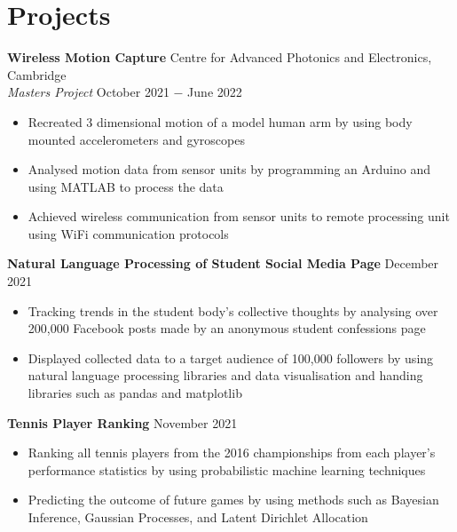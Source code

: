 \documentclass[8pt]{article}
\begin{document}
\section*{Projects}

\textbf{Wireless Motion Capture} \hfill Centre for Advanced Photonics and Electronics, Cambridge\\
\textit{Masters Project} \hfill October 2021 $-$ June 2022
\begin{itemize}
    \item Recreated 3 dimensional motion of a model human arm by using body mounted accelerometers and gyroscopes
    \item Analysed motion data from sensor units by programming an Arduino and using MATLAB to process the data
    \item Achieved wireless communication from sensor units to remote processing unit using WiFi communication protocols
\end{itemize} \medskip

\textbf{Natural Language Processing of Student Social Media Page} \hfill December 2021
\begin{itemize}
    \item Tracking trends in the student body's collective thoughts by analysing over 200,000 Facebook posts made by an anonymous student confessions page
    \item Displayed collected data to a target audience of 100,000 followers by using natural language processing libraries and data visualisation and handing libraries such as pandas and matplotlib
\end{itemize} \medskip

\textbf{Tennis Player Ranking} \hfill November 2021
\begin{itemize}
    \item Ranking all tennis players from the 2016 championships from each player's performance statistics by using probabilistic machine learning techniques
    \item Predicting the outcome of future games by using methods such as Bayesian Inference, Gaussian Processes, and Latent Dirichlet Allocation
\end{itemize} \medskip
\end{document}
